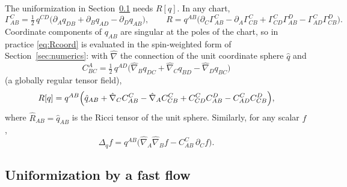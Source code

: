 \documentclass[11pt]{article}
\begin{document}
The uniformization in Section~\ref{sec:ricciflow} needs $R[q]$.  In any
chart,
\begin{equation}
  \Gamma^C_{AB} = \tfrac12\, q^{CD}\bigl(\partial_A q_{DB}
                  + \partial_B q_{AD} - \partial_D q_{AB}\bigr),
  \qquad
  R = q^{AB}\bigl(\partial_C\Gamma^C_{AB} - \partial_A\Gamma^C_{CB}
      + \Gamma^C_{CD}\Gamma^D_{AB} - \Gamma^C_{AD}\Gamma^D_{CB}\bigr).
  \label{eq:Rcoord}
\end{equation}
Coordinate components of $q_{AB}$ are singular at the poles of the chart, so
in practice \eqref{eq:Rcoord} is evaluated in the spin-weighted form of
Section~\ref{sec:numerics}: with $\hat\nabla$ the connection of the unit
coordinate sphere $\hat q$ and
\begin{equation}
  C^A_{BC} = \tfrac12\, q^{AD}\bigl(\hat\nabla_B q_{DC}
             + \hat\nabla_C q_{BD} - \hat\nabla_D q_{BC}\bigr)
  \label{eq:Cdiff}
\end{equation}
(a globally regular tensor field),
\begin{equation}
  R[q] = q^{AB}\Bigl(\hat q_{AB}
         + \hat\nabla_C C^C_{AB} - \hat\nabla_A C^C_{CB}
         + C^C_{CD} C^D_{AB} - C^C_{AD} C^D_{CB}\Bigr),
  \label{eq:Reth}
\end{equation}
where $\hat R_{AB} = \hat q_{AB}$ is the Ricci tensor of the unit sphere.
Similarly, for any scalar $f$,
\begin{equation}
  \Delta_q f = q^{AB}\bigl(\hat\nabla_A\hat\nabla_B f
               - C^C_{AB}\,\partial_C f\bigr).
  \label{eq:lapeth}
\end{equation}

\subsection{Uniformization by a fast flow}
\label{sec:ricciflow}
\end{document}
